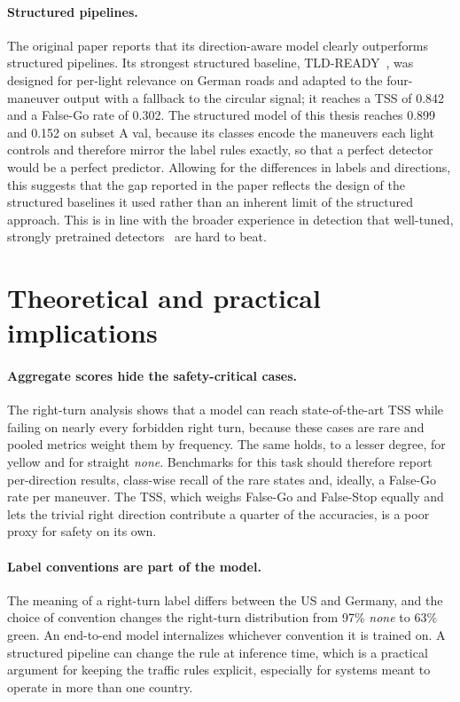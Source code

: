 \paragraph{Structured pipelines.} The original paper reports that its direction-aware model clearly
outperforms structured pipelines. Its strongest structured baseline, TLD-READY~\cite{polley2024tldready},
was designed for per-light relevance on German roads and adapted to the four-maneuver output with a
fallback to the circular signal; it reaches a TSS of 0.842 and a False-Go rate of 0.302. The structured
model of this thesis reaches 0.899 and 0.152 on subset A val, because its classes encode the maneuvers
each light controls and therefore mirror the label rules exactly, so that a perfect detector would be a
perfect predictor. Allowing for the differences in labels and directions, this suggests that the gap
reported in the paper reflects the design of the structured baselines it used rather than an inherent
limit of the structured approach. This is in line with the broader experience in detection that
well-tuned, strongly pretrained detectors~\cite{zhao2024detrs,chen2024lwdetr,robinson2025rfdetr} are hard
to beat.

\section{Theoretical and practical implications}
\label{sec:disc-implications}

\paragraph{Aggregate scores hide the safety-critical cases.} The right-turn analysis shows that a model
can reach state-of-the-art TSS while failing on nearly every forbidden right turn, because these cases
are rare and pooled metrics weight them by frequency. The same holds, to a lesser degree, for yellow and
for straight \emph{none}. Benchmarks for this task should therefore report per-direction results,
class-wise recall of the rare states and, ideally, a False-Go rate per maneuver. The TSS, which weighs
False-Go and False-Stop equally and lets the trivial right direction contribute a quarter of the
accuracies, is a poor proxy for safety on its own.

\paragraph{Label conventions are part of the model.} The meaning of a right-turn label differs between
the US and Germany, and the choice of convention changes the right-turn distribution from 97\% \emph{none}
to 63\% green. An end-to-end model internalizes whichever convention it is trained on. A structured
pipeline can change the rule at inference time, which is a practical argument for keeping the traffic
rules explicit, especially for systems meant to operate in more than one country.

